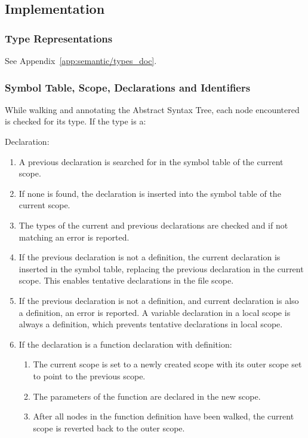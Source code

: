 \subsection{Implementation}

\subsubsection{Type Representations}

See Appendix~\ref{app:semantic/types_doc}.


\subsubsection{Symbol Table, Scope, Declarations and Identifiers}

While walking and annotating the Abstract Syntax Tree, each node encountered is checked for its type. If the type is a:

Declaration:
\begin{enumerate}
	\item A previous declaration is searched for in the symbol table of the current scope.
	\item If none is found, the declaration is inserted into the symbol table of the current scope.
	\item The types of the current and previous declarations are checked and if not matching an error is reported.
	\item If the previous declaration is not a definition, the current declaration is inserted in the symbol table, replacing the previous declaration in the current scope. This enables tentative declarations in the file scope.
	\item If the previous declaration is not a definition, and current declaration is also a definition, an error is reported. A variable declaration in a local scope is always a definition, which prevents tentative declarations in local scope.
	\item If the declaration is a function declaration with definition:
	\begin{enumerate}[1.]
		\item The current scope is set to a newly created scope with its outer scope set to point to the previous scope.
		\item The parameters of the function are declared in the new scope.
		\item After all nodes in the function definition have been walked, the current scope is reverted back to the outer scope.
	\end{enumerate}
\end{enumerate}

